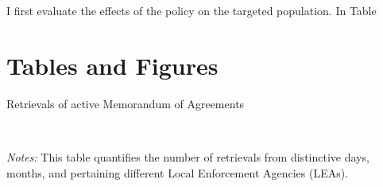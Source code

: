 \documentclass{article}
\begin{document}
I first evaluate the effects of the policy on the targeted population. In Table




\begin{comment}

in migration: previous year is different from the current year
\begin{equation}
    in-migration_{icy} = \beta_{0} + \beta_{1}exposure_{cy}*targeted_{i} +  \beta_{2}exposure_{cy} + \beta_{3}targeted_{i} + \beta_{42}W_{y} + \beta_{53}Z_{c} + \epsilon_{cy} 
\end{equation}

out migration 
\begin{equation}
    out-migration_{ic'y'} = \beta'_{0} + \beta'_{1}exposure_{c'y'}*targeted_{i} + \beta'_{2}exposure_{c'y'} + \beta'_{3}targeted_{i} + \beta'_{42}W_{y'} + \beta'_{43}Z_{c'} + \epsilon_{c'y'} 
\end{equation}
\end{comment}

\newpage


\newpage
\section{Tables and Figures}


\begin{table}[h]
\centering
\caption{Retrievals of active Memorandum of Agreements}
\label{tab:retrievals}
\end{table}

\justifying
\
\begin{spacing}{1}
\begin{footnotesize}
\noindent \textit{Notes:} This table quantifies the number of retrievals from distinctive days, months, and pertaining different Local Enforcement Agencies (LEAs).
\end{footnotesize}
\end{spacing}
\end{document}
